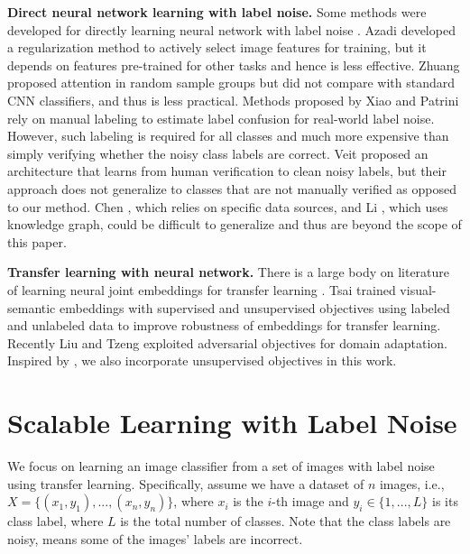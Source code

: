 \documentclass[10pt,twocolumn,letterpaper]{article}
\begin{document}
\noindent
\textbf{Direct neural network learning with label noise.} Some methods were developed for directly learning neural network with label noise \cite{azadi2016auxiliary,chen2015webly,li2017learning,patrini2017making,rolnick2017deep,sukhbaatar2014training,veit2017learning,xiao2015learning,zhuang2017attend}. Azadi \etal \cite{azadi2016auxiliary} developed a regularization method to actively select image features for training, but it depends on features pre-trained for other tasks and hence is less effective. Zhuang \etal \cite{zhuang2017attend} proposed attention in random sample groups but did not compare with standard CNN classifiers, and thus is less practical. Methods proposed by Xiao \etal \cite{xiao2015learning} and Patrini \etal \cite{patrini2017making} rely on manual labeling to estimate label confusion for real-world label noise. However, such labeling is required for all classes and much more expensive than simply verifying whether the noisy class labels are correct. Veit \etal \cite{veit2017learning} proposed an architecture that learns from human verification to clean noisy labels, but their approach does not generalize to classes that are not manually verified as opposed to our method. Chen \etal \cite{chen2015webly}, which relies on specific data sources, and Li \etal \cite{li2017learning}, which uses knowledge graph, could be difficult to generalize and thus are beyond the scope of this paper.


\noindent
\textbf{Transfer learning with neural network.} There is a large body on literature of learning neural joint embeddings for transfer learning \cite{frome2013devise,salvador2017learning,socher2013zero,tsai2017learning,vinyals2016matching}. Tsai \etal \cite{tsai2017learning} trained visual-semantic embeddings with supervised and unsupervised objectives using labeled and unlabeled data to improve robustness of embeddings for transfer learning. Recently Liu \etal \cite{liu2016coupled} and Tzeng \etal \cite{tzeng2017adversarial} exploited adversarial objectives for domain adaptation. Inspired by \cite{tsai2017learning}, we also incorporate unsupervised objectives in this work.

\section{Scalable Learning with Label Noise}
We focus on learning an image classifier from a set of images with label noise using transfer learning. Specifically, assume we have a dataset of $n$ images, i.e., $X = \{(x_1,y_1),...,(x_n,y_n)\}$, where $x_i$ is the $i$-th image and $y_i \in \{1,...,L\}$ is its class label, where $L$ is the total number of classes. Note that the class labels are noisy, means some of the images' labels are incorrect.
\end{document}
